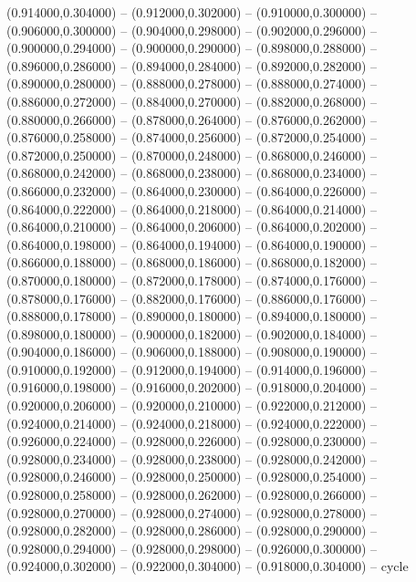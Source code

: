    (0.914000,0.304000) -- (0.912000,0.302000) -- (0.910000,0.300000) -- (0.906000,0.300000) -- (0.904000,0.298000) -- (0.902000,0.296000) -- (0.900000,0.294000) -- (0.900000,0.290000) -- (0.898000,0.288000) -- (0.896000,0.286000) -- (0.894000,0.284000) -- (0.892000,0.282000) -- (0.890000,0.280000) -- (0.888000,0.278000) -- (0.888000,0.274000) -- (0.886000,0.272000) -- (0.884000,0.270000) -- (0.882000,0.268000) -- (0.880000,0.266000) -- (0.878000,0.264000) -- (0.876000,0.262000) -- (0.876000,0.258000) -- (0.874000,0.256000) -- (0.872000,0.254000) -- (0.872000,0.250000) -- (0.870000,0.248000) -- (0.868000,0.246000) -- (0.868000,0.242000) -- (0.868000,0.238000) -- (0.868000,0.234000) -- (0.866000,0.232000) -- (0.864000,0.230000) -- (0.864000,0.226000) -- (0.864000,0.222000) -- (0.864000,0.218000) -- (0.864000,0.214000) -- (0.864000,0.210000) -- (0.864000,0.206000) -- (0.864000,0.202000) -- (0.864000,0.198000) -- (0.864000,0.194000) -- (0.864000,0.190000) -- (0.866000,0.188000) -- (0.868000,0.186000) -- (0.868000,0.182000) -- (0.870000,0.180000) -- (0.872000,0.178000) -- (0.874000,0.176000) -- (0.878000,0.176000) -- (0.882000,0.176000) -- (0.886000,0.176000) -- (0.888000,0.178000) -- (0.890000,0.180000) -- (0.894000,0.180000) -- (0.898000,0.180000) -- (0.900000,0.182000) -- (0.902000,0.184000) -- (0.904000,0.186000) -- (0.906000,0.188000) -- (0.908000,0.190000) -- (0.910000,0.192000) -- (0.912000,0.194000) -- (0.914000,0.196000) -- (0.916000,0.198000) -- (0.916000,0.202000) -- (0.918000,0.204000) -- (0.920000,0.206000) -- (0.920000,0.210000) -- (0.922000,0.212000) -- (0.924000,0.214000) -- (0.924000,0.218000) -- (0.924000,0.222000) -- (0.926000,0.224000) -- (0.928000,0.226000) -- (0.928000,0.230000) -- (0.928000,0.234000) -- (0.928000,0.238000) -- (0.928000,0.242000) -- (0.928000,0.246000) -- (0.928000,0.250000) -- (0.928000,0.254000) -- (0.928000,0.258000) -- (0.928000,0.262000) -- (0.928000,0.266000) -- (0.928000,0.270000) -- (0.928000,0.274000) -- (0.928000,0.278000) -- (0.928000,0.282000) -- (0.928000,0.286000) -- (0.928000,0.290000) -- (0.928000,0.294000) -- (0.928000,0.298000) -- (0.926000,0.300000) -- (0.924000,0.302000) -- (0.922000,0.304000) -- (0.918000,0.304000) -- cycle
